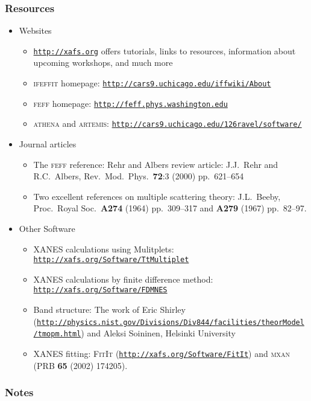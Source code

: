 
\begin{frame}
  \frametitle{Resources}
  \begin{itemize}
  \item Websites
    \begin{itemize}
    \item \footnotesize
      \href{http://xafs.org}{\color{Purple4}\texttt{http://xafs.org}}
      offers tutorials, links to resources, information about upcoming
      workshops, and much more
    \item \textsc{ifeffit} homepage:
      \href{http://cars9.uchicago.edu/iffwiki/About}
      {\color{Purple4}\texttt{http://cars9.uchicago.edu/iffwiki/About}}
    \item \textsc{feff} homepage:
      \href{http://feff.phys.washington.edu}
      {\color{Purple4}\texttt{http://feff.phys.washington.edu}}
    \item \textsc{athena} and \textsc{artemis}:
      \href{http://cars9.uchicago.edu/~ravel/software/}
      {\color{Purple4}\texttt{http://cars9.uchicago.edu/\char126ravel/software/}}
    \end{itemize}
  \item Journal articles
    \begin{itemize}
    \item \footnotesize The \textsc{feff} reference: Rehr and Albers review article:   J.J.~Rehr and R.C.~Albers,
      Rev.\ Mod.\ Phys.\ \textbf{72}:3 (2000) pp.\ 621--654
    \item Two excellent references on multiple scattering theory:
      J.L.~Beeby, Proc.\ Royal Soc.\ \textbf{A274} (1964) pp.\
      309--317 and \textbf{A279} (1967) pp.\ 82--97.
    \end{itemize}
  \item Other Software
    \begin{itemize}
    \item \footnotesize XANES calculations using Mulitplets:
      \href{http://xafs.org/Software/TtMultiplet}
      {\color{Purple4}\texttt{http://xafs.org/Software/TtMultiplet}}
    \item XANES calculations by finite difference method:
      \href{http://xafs.org/Software/FDMNES}
      {\color{Purple4}\texttt{http://xafs.org/Software/FDMNES}}
    \item Band structure: The work of Eric Shirley
      (\href{http://physics.nist.gov/Divisions/Div844/facilities/theorModel/tmopm.html}
      {\color{Purple4}\tiny \texttt{http://physics.nist.gov/Divisions/Div844/facilities/theorModel/tmopm.html}}) and
      Aleksi Soininen, Helsinki University
    \item XANES fitting: \textsc{FitIt} (\href{http://xafs.org/Software/FitIt}{\color{Purple4}\texttt{http://xafs.org/Software/FitIt}})
      and \textsc{mxan} (PRB \textbf{65} (2002) 174205).
    \end{itemize}
  \end{itemize}
\end{frame}

\begin{frame}
  \frametitle{Notes}
\end{frame}

